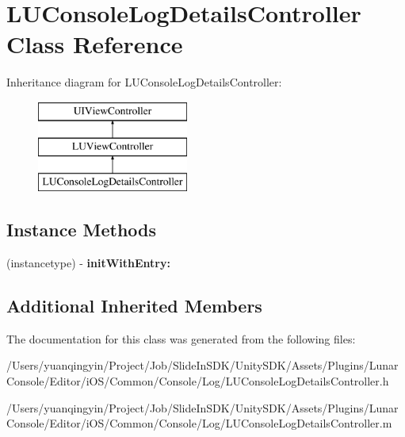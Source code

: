 \hypertarget{interface_l_u_console_log_details_controller}{}\section{L\+U\+Console\+Log\+Details\+Controller Class Reference}
\label{interface_l_u_console_log_details_controller}
Inheritance diagram for L\+U\+Console\+Log\+Details\+Controller\+:\begin{figure}[H]
\begin{center}
\leavevmode
\includegraphics[height=3.000000cm]{interface_l_u_console_log_details_controller}
\end{center}
\end{figure}
\subsection*{Instance Methods}
\begin{DoxyCompactItemize}
\item 
\mbox{\label{interface_l_u_console_log_details_controller_a51c811a46c5f070b8d69b0fdfa9460a7}} 
(instancetype) -\/ {\bfseries init\+With\+Entry\+:}
\end{DoxyCompactItemize}
\subsection*{Additional Inherited Members}


The documentation for this class was generated from the following files\+:\begin{DoxyCompactItemize}
\item 
/\+Users/yuanqingyin/\+Project/\+Job/\+Slide\+In\+S\+D\+K/\+Unity\+S\+D\+K/\+Assets/\+Plugins/\+Lunar\+Console/\+Editor/i\+O\+S/\+Common/\+Console/\+Log/L\+U\+Console\+Log\+Details\+Controller.\+h\item 
/\+Users/yuanqingyin/\+Project/\+Job/\+Slide\+In\+S\+D\+K/\+Unity\+S\+D\+K/\+Assets/\+Plugins/\+Lunar\+Console/\+Editor/i\+O\+S/\+Common/\+Console/\+Log/L\+U\+Console\+Log\+Details\+Controller.\+m\end{DoxyCompactItemize}
